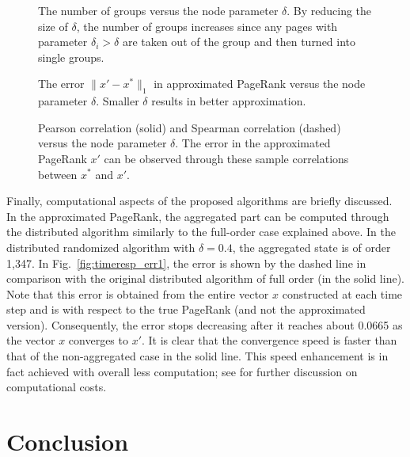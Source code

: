 \documentclass[11pt,draftcls,onecolumn]{IEEEtran}
\newcommand{\norm}[1]{\lVert#1\rVert}
\newcommand{\fig}[3]{\resizebox{#1}{#2}{\texttt{[image: \#3]}}}
\begin{document}
\begin{figure}[t]
  \centering
  \fig{9cm}{!}{num_grp_delta.eps}
  \caption{The number of groups versus the node parameter $\delta$. By reducing the size of $\delta$,
  the number of groups increases since any pages with parameter $\delta_i>\delta$ are taken out of 
   the group and then turned into single groups.}
  \label{fig:num_grp_delta}
\end{figure}

\begin{figure}[t]
  \centering
  \fig{9cm}{!}{error_delta.eps}
  \caption{The error $\norm{x'-x^*}_1$ in approximated PageRank versus the node parameter $\delta$.
           Smaller $\delta$ results in better approximation.}
  \label{fig:error_delta}
\end{figure}

\begin{figure}[t]
  \centering
  \fig{9cm}{!}{correlation_delta.eps}
  \caption{Pearson correlation (solid) and Spearman correlation (dashed) versus the
           node parameter $\delta$. The error in the approximated PageRank $x'$ can 
            be observed through these sample correlations between $x^*$ and $x'$.}
  \label{fig:correlation_delta}
\end{figure}


Finally, computational aspects of the proposed algorithms are
briefly discussed.
In the approximated PageRank, the aggregated part can be computed through the
distributed algorithm similarly to the full-order case explained above. 
In the distributed randomized algorithm with $\delta=0.4$, the aggregated state 
is of order 1,347. In Fig.~\ref{fig:timeresp_err1}, the error is shown by the dashed line 
in comparison with the original distributed algorithm of full order (in the solid line).
Note that this error is obtained from the entire vector $x$ constructed at 
each time step and is with respect to the true PageRank
(and not the approximated version). Consequently,
the error stops decreasing after it reaches about 0.0665 as the vector $x$ converges 
to $x'$.
It is clear that the convergence speed is faster than that of the 
non-aggregated case in the solid line. 
This speed enhancement is in fact achieved with overall less computation; see \cite{IshTemBai:12}
for further discussion on computational costs.

\section*{Conclusion}
\label{sec:concl}
\end{document}
